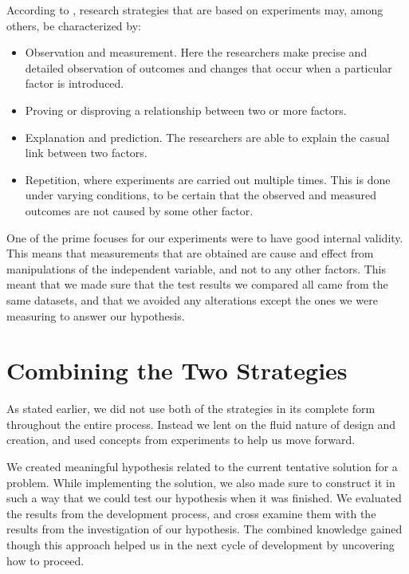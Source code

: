 According to \citep{oates2005researching}, research strategies that are based on experiments may, among others, be characterized by:

\begin{itemize}
    \item Observation and measurement. Here the researchers make precise and detailed observation of outcomes and changes that occur when a particular factor is introduced.
    \item Proving or disproving a relationship between two or more factors.
    \item Explanation and prediction. The researchers are able to explain the casual link between two factors.
    \item Repetition, where experiments are carried out multiple times. This is done under varying conditions, to be certain that the observed and measured outcomes are not caused by some other factor.
\end{itemize}

One of the prime focuses for our experiments were to have good internal validity. This means that measurements that are obtained are cause and effect from manipulations of the independent variable, and not to any other factors. This meant that we made sure that the test results we compared all came from the same datasets, and that we avoided any alterations except the ones we were measuring to answer our hypothesis.


\section{Combining the Two Strategies}
\label{sec:combining_the_two_strategies}
As stated earlier, we did not use both of the strategies in its complete form throughout the entire process. Instead we lent on the fluid nature of design and creation, and used concepts from experiments to help us move forward. 

We created meaningful hypothesis related to the current tentative solution for a problem. While implementing the solution, we also made sure to construct it in such a way that we could test our hypothesis when it was finished. We evaluated the results from the development process, and cross examine them with the results from the investigation of our hypothesis. The combined knowledge gained though this approach helped us in the next cycle of development by uncovering how to proceed.

